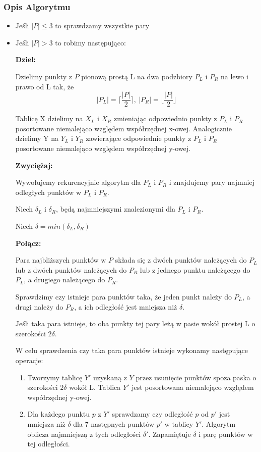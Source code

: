 \subsubsection{Opis Algorytmu}
\begin{itemize}
\item Jeśli $\vert P \vert \leq 3$ to sprawdzamy wszystkie pary

\item Jeśli $\vert P \vert > 3$ to robimy następująco:

	
		\textbf{Dziel: } 		

		Dzielimy punkty z $P$ pionową prostą L na dwa podzbiory $P_L$ i $P_R$ na lewo i prawo od L tak, że $$\vert P_L \vert= \lceil \frac{\vert P \vert}{2}\rceil,\ \vert P_R \vert = \lfloor \frac{\vert P \vert}{2} \rfloor $$
	
		Tablicę X dzielimy na $X_L$ i $X_R$ zmieniając odpowiednio punkty z $P_L$ i $P_R$ posortowane niemalejąco względem współrzędnej x-owej. Analogicznie dzielimy Y na $Y_L$ i $Y_R$ zawierające odpowiednie punkty z $P_L$ i $P_R$ posortowane niemalejąco względem współrzędnej y-owej.

		\textbf{Zwyciężaj: }
		
Wywołujemy rekurencyjnie algorytm dla $P_L$ i $P_R$ i znajdujemy pary najmniej odległych punktów w $P_L$ i $P_R$. 

Niech $\delta_L$ i $\delta_R$, będą najmniejszymi znalezionymi dla $P_L$ i $P_R$. 

Niech $\delta=min(\delta_L,\delta_R)$
		
		\textbf{Połącz: } 

		Para najbliższych punktów w $P$ składa się z dwóch punktów należących do $P_L$ lub z dwóch punktów należących do $P_R$ lub z jednego punktu należącego do $P_L$, a drugiego należącego do $P_R$.
			
		Sprawdzimy czy istnieje para punktów taka, że jeden punkt należy do $P_L$, a drugi należy do $P_R$, a ich odległość jest mniejsza niż $\delta$.
		
		Jeśli taka para istnieje, to oba punkty tej pary leżą w pasie wokół prostej L o szerokości $2\delta$.
		
		W celu sprawdzenia czy taka para punktów istnieje wykonamy następujące operacje:
		\begin{enumerate}
			\item Tworzymy tablicę $Y'$ uzyskaną z $Y$ przez usunięcie punktów spoza paska o szerokości $2\delta$ wokół L. Tablica $Y'$ jest posortowana niemalejąco względem współrzędnej y-owej.
			\item Dla każdego punktu $p$ z $Y'$ sprawdzamy czy odległość $p$ od $p'$ jest mniejsza niż $\delta$ dla 7 następnych punktów $p'$ w tablicy $Y'$. Algorytm oblicza najmniejszą z tych odległości $\delta'$. Zapamiętuje $\delta$ i parę punktów w tej odległości.
		\end{enumerate}
		

\end{itemize}
